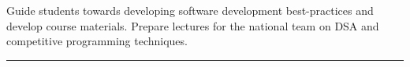 \vspace{-0.4mm}
\resumeSubHeadingListStart
\ifdefined\showSoftwareConstructionTA
{}
{Guide students towards developing software development best-practices and develop course materials.}
{}
\fi
\vspace{0.5mm}
\ifdefined\showDominicanOlympiadTrainer
{}
{Prepare lectures for the national team on DSA and competitive programming techniques.}{}
\fi
\vspace{-1mm}
\resumeSubHeadingListEnd
\hspace*{-2mm}\rule{1.030\textwidth}{0.1mm}
\vspace{0mm}
